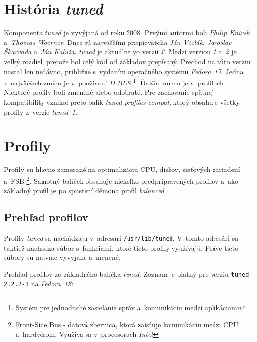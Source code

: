 %
%

\section{História \emph{tuned}}
\label{sec:historiaTuned}

Komponenta \emph{tuned} je vyvýjaná od roku 2008. Prvými autormi boli
\emph{Philip Knirsh} a~\emph{Thomas Woerner}. Dnes sú najväčšími prispievatelia
\emph{Ján Včelák}, \emph{Jaroslav Škarvada} a~\emph{Ján Kaluža}.  \emph{tuned}
je aktuálne vo verzii \emph{2}. Medzi verziou \emph{1} a~\emph{2} je veľký
rozdiel, pretože bol celý kód od základov prepísaný. Prechod na túto verziu
nastal len nedávno, približne s~vydaním operačného systému \emph{Fedora~17}.
Jedna z~najväčších zmien je v~používaní \emph{D-BUS} \footnote{Systém pre
jednoduché zasielanie správ a~komunikáciu medzi aplikáciami}. Ďalšia zmena je
v~profiloch. Niektoré profily boli zmenené alebo odobraté. Pre zachovanie
spätnej kompatibility vznikol preto balík \emph{tuned-profiles-compat}, ktorý
obsahuje všetky profily z~verzie \emph{tuned~1}.

%
%

\section{Profily}
\label{sec:profiles}

Profily su hlavne zamerané na optimalizáciu CPU, diskov, sieťových zariadení
a~FSB \footnote{Front-Side Bus - datová zbernica, ktorá zaisťuje komunikáciu
medzi CPU a~hardvérom. Využíva sa v~procesoroch \emph{Intel}}. Samotný balíček
obsahuje niekoľko predpripravených profilov a~ako základný profil je po spustení
démona profil \emph{balanced}.

%
%

\subsection{Prehľad profilov}
\label{sec:prehladProfilov}

Profily \emph{tuned} sa nachádzajú v~adresári \texttt{/usr/lib/tuned}. V~tomto
adresári sa taktiež nachádza súbor s~funkciami, ktoré tieto profily využívajú.
Práve tieto súbory sú najviac vyvýjané a~menené.

Prehľad profilov zo základného balíčka \emph{tuned}. Zoznam je platný pre
verziu \texttt{tuned-2.2.2-1} na \emph{Fedora~18}:


